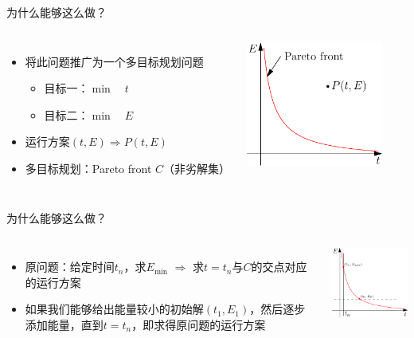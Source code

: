 \documentclass{beamer}
\begin{document}
\begin{frame}{为什么能够这么做？}
    \begin{columns}[c]
        \column{8cm}
            \begin{itemize}
              \item 将此问题推广为一个多目标规划问题
                \begin{itemize}
                  \item 目标一：$\min \quad t$
                  \item 目标二：$\min \quad E$
                \end{itemize}
              \item 运行方案$(t,E) \Longrightarrow  P(t,E)$
              \item 多目标规划：Pareto front $C$（非劣解集）
            \end{itemize}
        \column{5cm}\includegraphics[width=4.5cm]{fig/fig1/fig1.pdf}
    \end{columns}
\end{frame}

\begin{frame}{为什么能够这么做？}
    \begin{columns}[c]
        \column{8cm}
            \begin{itemize}
              \item 原问题：给定时间$t_n$，求$E_{\min}$ $\Longrightarrow$ 求$t = t_n$与$C$的交点对应的运行方案
              \item 如果我们能够给出能量较小的初始解$(t_1,E_1)$，然后逐步添加能量，直到$t = t_n$，即求得原问题的运行方案
            \end{itemize}
        \column{5cm}\includegraphics[width=4.5cm]{fig/fig2/fig2.pdf}
    \end{columns}
\end{frame}
\end{document}
